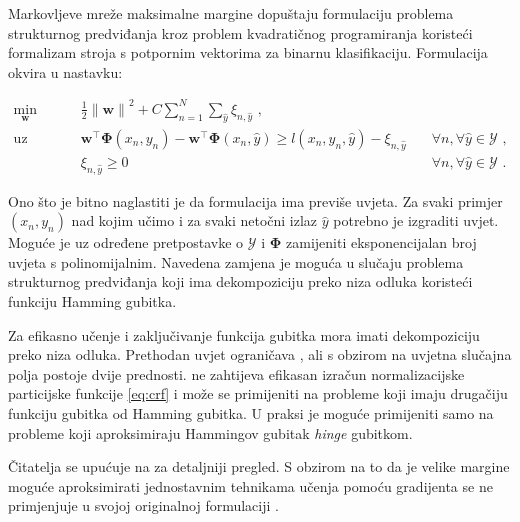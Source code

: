 Markovljeve mreže maksimalne margine  dopuštaju formulaciju problema strukturnog predviđanja kroz
problem kvadratičnog programiranja  koristeći
formalizam stroja s potpornim vektorima za binarnu klasifikaciju. Formulacija
\mmmm{} okvira u nastavku:

\begin{equation}\label{eq:mmmm}
\begin{aligned}
  \min_{\mathbf{w}} & \quad \frac{1}{2} {\lVert\mathbf{w}\lVert}^2 + C \sum_{n=1}^{N}\sum_{\hat{y}} \xi_{n,\hat{y}} \text{ ,}              & \\
  \text{uz uvjete}  & \quad \mathbf{w}^\top \mathbf{\Phi}(x_n, y_n) - \mathbf{w}^\top \mathbf{\Phi}(x_n, \hat{y}) \ge l(x_n, y_n, \hat{y}) - \xi_{n,\hat{y}} & \quad \forall n, \forall \hat{y} \in \mathcal{Y} \text{ ,}\\
                    & \quad \xi_{n,\hat{y}} \ge 0                                                                                          & \quad \forall n, \forall \hat{y} \in \mathcal{Y} \text{ .}
\end{aligned}
\end{equation}

\noindent
Ono što je bitno naglastiti je da \mmmm{} formulacija ima previše uvjeta. Za
svaki primjer $(x_n, y_n)$ nad kojim učimo i za svaki netočni izlaz $\hat{y}$
potrebno je izgraditi uvjet. Moguće je uz određene pretpostavke o $\mathcal{Y}$
i $\mathbf{\Phi}$ zamijeniti eksponencijalan broj uvjeta s polinomijalnim.
Navedena zamjena je moguća u slučaju problema strukturnog predviđanja koji ima
dekompoziciju preko niza odluka koristeći funkciju Hamming gubitka.

Za efikasno učenje i zaključivanje funkcija gubitka mora imati dekompoziciju
preko niza odluka. Prethodan uvjet ograničava \mmmm{}, ali s obzirom na uvjetna
slučajna polja postoje dvije prednosti. \mmmm{} ne zahtijeva efikasan izračun
normalizacijske particijske funkcije \ref{eq:crf} i može se primijeniti na
probleme koji imaju drugačiju funkciju gubitka od Hamming gubitka. U praksi je
moguće primijeniti \mmmm{} samo na probleme koji aproksimiraju Hammingov gubitak
\textit{hinge} gubitkom.

Čitatelja se upućuje na \citep{taskar2003maximum} za detaljniji pregled. S
obzirom na to da je velike margine moguće aproksimirati jednostavnim tehnikama
učenja pomoću gradijenta \mmmm{} se ne primjenjuje u svojoj originalnoj
formulaciji \citep{daume2005learning, ratliff2006maximum}.

